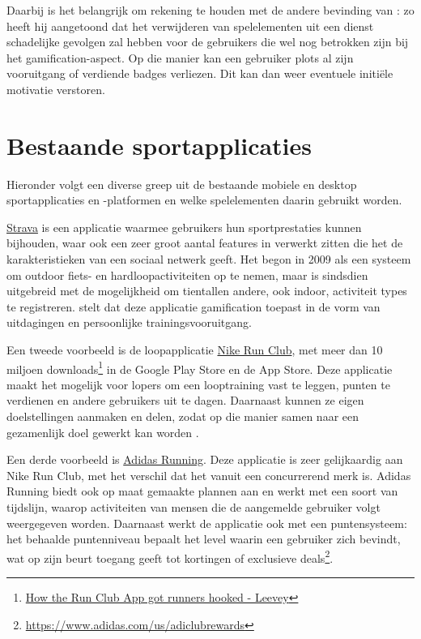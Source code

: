 Daarbij is het belangrijk om rekening te houden met de andere bevinding van \textcite{Hamari2013a}: zo heeft hij aangetoond dat het verwijderen van spelelementen uit een dienst schadelijke gevolgen zal hebben voor de gebruikers die wel nog betrokken zijn bij het gamification-aspect. Op die manier kan een gebruiker plots al zijn vooruitgang of verdiende badges verliezen. Dit kan dan weer eventuele initiële motivatie verstoren.

\section{Bestaande sportapplicaties}
Hieronder volgt een diverse greep uit de bestaande mobiele en desktop sportapplicaties en -platformen en welke spelelementen daarin gebruikt worden.

\href{https://www.strava.com/}{Strava} is een applicatie waarmee gebruikers hun sportprestaties kunnen bijhouden, waar ook een zeer groot aantal features in verwerkt zitten die het de karakteristieken van een sociaal netwerk geeft. Het begon in 2009 als een systeem om outdoor fiets- en hardloopactiviteiten op te nemen, maar is sindsdien uitgebreid met de mogelijkheid om tientallen andere, ook indoor, activiteit types te registreren. \textcite{Barratt2017} stelt dat deze applicatie gamification toepast in de vorm van uitdagingen en persoonlijke trainingsvooruitgang.

Een tweede voorbeeld is de loopapplicatie \href{https://www.nike.com/be/en/nrc-app}{Nike Run Club}, met meer dan 10 miljoen downloads\footnote{\href{https://bootcamp.uxdesign.cc/how-the-nike-run-club-app-got-runners-hooked-2850c7654fc5}{How the Run Club App got runners hooked - Leevey}} in de Google Play Store en de App Store. Deze applicatie maakt het mogelijk voor lopers om een looptraining vast te leggen, punten te verdienen en andere gebruikers uit te dagen. Daarnaast kunnen ze eigen doelstellingen aanmaken en delen, zodat op die manier samen naar een gezamenlijk doel gewerkt kan worden \autocite{StaalnackeLarsson2013}.

Een derde voorbeeld is \href{https://www.runtastic.com/}{Adidas Running}. Deze applicatie is zeer gelijkaardig aan Nike Run Club, met het verschil dat het vanuit een concurrerend merk is. Adidas Running biedt ook op maat gemaakte plannen aan en werkt met een soort van tijdslijn, waarop activiteiten van mensen die de aangemelde gebruiker volgt weergegeven worden. Daarnaast werkt de applicatie ook met een puntensysteem: het behaalde puntenniveau bepaalt het level waarin een gebruiker zich bevindt, wat op zijn beurt toegang geeft tot kortingen of exclusieve deals\footnote{\href{https://www.adidas.com/us/adiclubrewards}{https://www.adidas.com/us/adiclubrewards}}.

